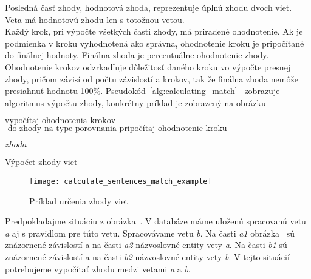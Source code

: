 Posledná časť zhody, hodnotová zhoda, reprezentuje úplnú zhodu dvoch viet. Veta má hodnotovú zhodu len s totožnou vetou. \\

Každý krok, pri výpočte všetkých časti zhody, má priradené ohodnotenie. Ak je podmienka v kroku vyhodnotená ako správna, ohodnotenie kroku je pripočítané do finálnej hodnoty. Finálna zhoda je percentuálne ohodnotenie zhody. Ohodnotenie krokov odzrkadľuje dôležitosť daného kroku vo výpočte presnej zhody, pričom závisí od počtu závislostí a krokov, tak že finálna zhoda nemôže presiahnuť hodnotu 100\%. Pseudokód~\ref{alg:calculating_match}~ zobrazuje algoritmus výpočtu zhody, konkrétny príklad je zobrazený na obrázku~

\begin{algorithm}[H]
	\footnotesize %
	\begin{algorithmic}[1]

		\State $\text{vypočítaj ohodnotenia krokov}$
		\State $\text{ do zhody na type porovnania pripočítaj ohodnotenie kroku}$
		\EndIf
		\EndFor
		\EndFor
		\EndFor
		
		\Return $zhoda$
		\EndProcedure
	\end{algorithmic}
	\caption[Výpočet zhody viet]{Výpočet zhody viet}	
	\label{alg:calculating_match}
\end{algorithm}

\begin{figure}[H]
	\begin{center}\texttt{[image: calculate\_sentences\_match\_example]}\end{center}
	\caption[Príklad určenia zhody viet]{Príklad určenia zhody viet}\label{fig:calculate_match_sentences_example}
\end{figure}

Predpokladajme situáciu z obrázka~. V databáze máme uloženú spracovanú vetu \textit{a} aj s pravidlom pre túto vetu. Spracovávame vetu \textit{b}. Na časti \textit{a1} obrázka~ sú znázornené závislostí a na časti \textit{a2} názvoslovné entity vety \textit{a}. Na časti \textit{b1} sú znázornené závislostí a na časti \textit{b2} názvoslovné entity vety \textit{b}. V tejto situácií potrebujeme vypočítať zhodu medzi vetami \textit{a} a \textit{b}. 

